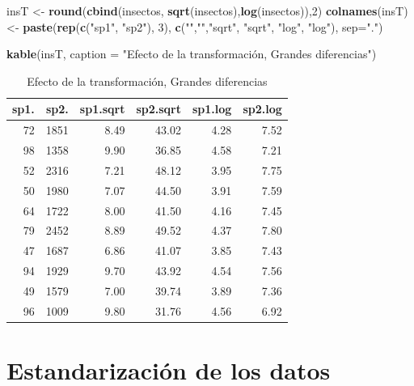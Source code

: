 \documentclass[]{book}
\newenvironment{Shaded}{\begin{snugshade}}{\end{snugshade}}
\newcommand{\KeywordTok}[1]{\textcolor[rgb]{0.13,0.29,0.53}{\textbf{{#1}}}}
\newcommand{\DataTypeTok}[1]{\textcolor[rgb]{0.13,0.29,0.53}{{#1}}}
\newcommand{\DecValTok}[1]{\textcolor[rgb]{0.00,0.00,0.81}{{#1}}}
\newcommand{\StringTok}[1]{\textcolor[rgb]{0.31,0.60,0.02}{{#1}}}
\newcommand{\NormalTok}[1]{{#1}}
\begin{document}
\begin{Shaded}
\begin{Highlighting}[]
\NormalTok{insT <-}\StringTok{ }\KeywordTok{round}\NormalTok{(}\KeywordTok{cbind}\NormalTok{(insectos, }\KeywordTok{sqrt}\NormalTok{(insectos),}\KeywordTok{log}\NormalTok{(insectos)),}\DecValTok{2}\NormalTok{) }
\KeywordTok{colnames}\NormalTok{(insT) <-}\StringTok{ }\KeywordTok{paste}\NormalTok{(}\KeywordTok{rep}\NormalTok{(}\KeywordTok{c}\NormalTok{(}\StringTok{"sp1"}\NormalTok{, }\StringTok{"sp2"}\NormalTok{), }\DecValTok{3}\NormalTok{), }\KeywordTok{c}\NormalTok{(}\StringTok{""}\NormalTok{,}\StringTok{""}\NormalTok{,}\StringTok{"sqrt"}\NormalTok{, }\StringTok{"sqrt"}\NormalTok{, }\StringTok{"log"}\NormalTok{, }\StringTok{"log"}\NormalTok{), }\DataTypeTok{sep=}\StringTok{"."}\NormalTok{)}

\KeywordTok{kable}\NormalTok{(insT, }\DataTypeTok{caption =} \StringTok{"Efecto de la transformación, Grandes diferencias"}\NormalTok{)}
\end{Highlighting}
\end{Shaded}

\begin{table}[t]

\caption{\label{tab:unnamed-chunk-16}Efecto de la transformación, Grandes diferencias}
\centering
\begin{tabular}{r|r|r|r|r|r}
\hline
sp1. & sp2. & sp1.sqrt & sp2.sqrt & sp1.log & sp2.log\\
\hline
72 & 1851 & 8.49 & 43.02 & 4.28 & 7.52\\
\hline
98 & 1358 & 9.90 & 36.85 & 4.58 & 7.21\\
\hline
52 & 2316 & 7.21 & 48.12 & 3.95 & 7.75\\
\hline
50 & 1980 & 7.07 & 44.50 & 3.91 & 7.59\\
\hline
64 & 1722 & 8.00 & 41.50 & 4.16 & 7.45\\
\hline
79 & 2452 & 8.89 & 49.52 & 4.37 & 7.80\\
\hline
47 & 1687 & 6.86 & 41.07 & 3.85 & 7.43\\
\hline
94 & 1929 & 9.70 & 43.92 & 4.54 & 7.56\\
\hline
49 & 1579 & 7.00 & 39.74 & 3.89 & 7.36\\
\hline
96 & 1009 & 9.80 & 31.76 & 4.56 & 6.92\\
\hline
\end{tabular}
\end{table}

\section{Estandarización de los
datos}\label{estandarizacion-de-los-datos}
\end{document}
